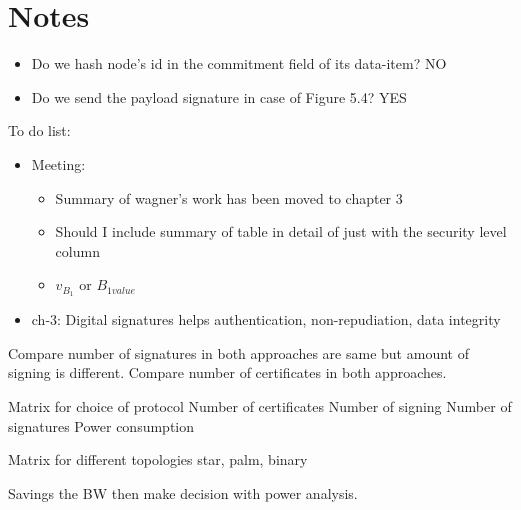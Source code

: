 \chapter{Notes}

\begin{itemize}
	\item Do we hash node's id in the commitment field of its data-item? NO
	\item Do we send the payload signature in case of Figure 5.4? YES
\end{itemize}

To do list:
\begin{itemize}
	\item Meeting: 
	\begin{itemize}
		\item Summary of wagner's work has been moved to chapter 3
		\item Should I include summary of table in detail of just with the security level column
		\item $v_{B_{1}}$ or $B_{1value}$
	\end{itemize}
	\item ch-3: Digital signatures helps authentication, non-repudiation, data integrity

\end{itemize}
	
	Compare number of signatures in both approaches are same but amount of signing is different.
	Compare number of certificates in both approaches.

	Matrix for choice of protocol
		Number of certificates
		Number of signing
		Number of signatures
		Power consumption

	Matrix for different topologies
		star, palm, binary 
		
	Savings the BW then make decision with power analysis.
